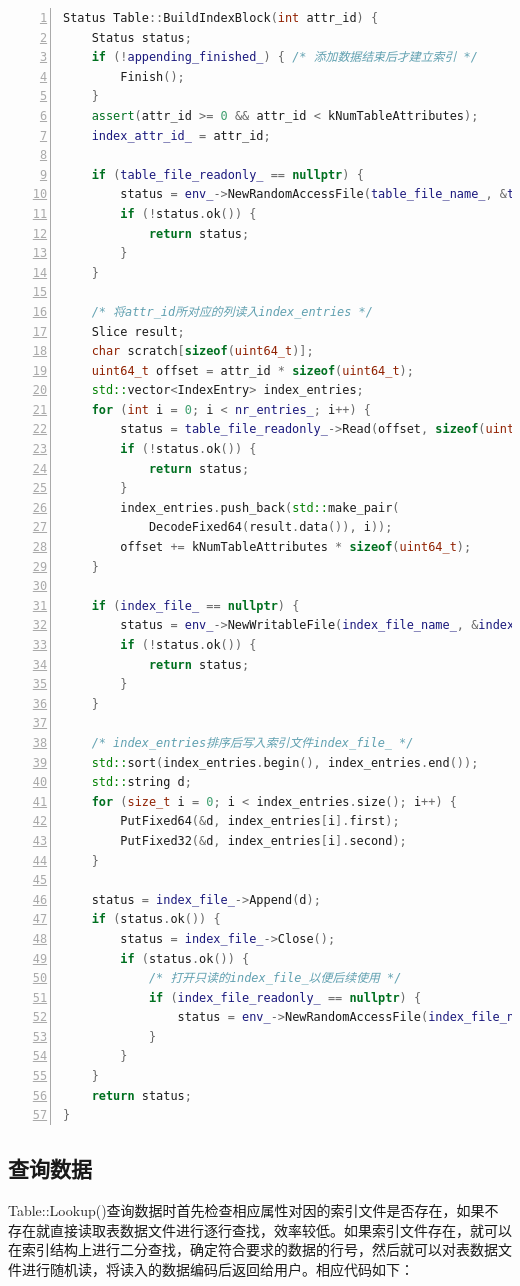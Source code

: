 \documentclass[bachelor]{thesis-uestc}
\begin{document}
\begin{lstlisting}[language=C++, basicstyle=\ttfamily\tiny, numbers=left, numberstyle=\tiny, keywordstyle=\color{blue!70}, commentstyle=\color{red!50!green!50!blue!50}, frame=shadowbox, rulesepcolor=\color{red!20!green!20!blue!20}]
Status Table::BuildIndexBlock(int attr_id) {
	Status status;
	if (!appending_finished_) { /* 添加数据结束后才建立索引 */
		Finish();
	}
	assert(attr_id >= 0 && attr_id < kNumTableAttributes);
	index_attr_id_ = attr_id;
	
	if (table_file_readonly_ == nullptr) {
		status = env_->NewRandomAccessFile(table_file_name_, &table_file_readonly_);
		if (!status.ok()) {
			return status;
		}
	}
	
	/* 将attr_id所对应的列读入index_entries */
	Slice result;
	char scratch[sizeof(uint64_t)];
	uint64_t offset = attr_id * sizeof(uint64_t);
	std::vector<IndexEntry> index_entries;
	for (int i = 0; i < nr_entries_; i++) {
		status = table_file_readonly_->Read(offset, sizeof(uint64_t), scratch, &result);
		if (!status.ok()) {
			return status;
		}
		index_entries.push_back(std::make_pair(
			DecodeFixed64(result.data()), i));
		offset += kNumTableAttributes * sizeof(uint64_t);
	}
	
	if (index_file_ == nullptr) {
		status = env_->NewWritableFile(index_file_name_, &index_file_);
		if (!status.ok()) {
			return status;
		}
	}
	
	/* index_entries排序后写入索引文件index_file_ */
	std::sort(index_entries.begin(), index_entries.end());
	std::string d;
	for (size_t i = 0; i < index_entries.size(); i++) {
		PutFixed64(&d, index_entries[i].first);
		PutFixed32(&d, index_entries[i].second);
	}
	
	status = index_file_->Append(d);
	if (status.ok()) {
		status = index_file_->Close();
		if (status.ok()) {
			/* 打开只读的index_file_以便后续使用 */
			if (index_file_readonly_ == nullptr) {
				status = env_->NewRandomAccessFile(index_file_name_, &index_file_readonly_);
			}
		}
	}
	return status;
}
\end{lstlisting}

\subsection{查询数据}
 Table::Lookup()查询数据时首先检查相应属性对因的索引文件是否存在，如果不存在就直接读取表数据文件进行逐行查找，效率较低。如果索引文件存在，就可以在索引结构上进行二分查找，确定符合要求的数据的行号，然后就可以对表数据文件进行随机读，将读入的数据编码后返回给用户。相应代码如下：
 
\end{document}
